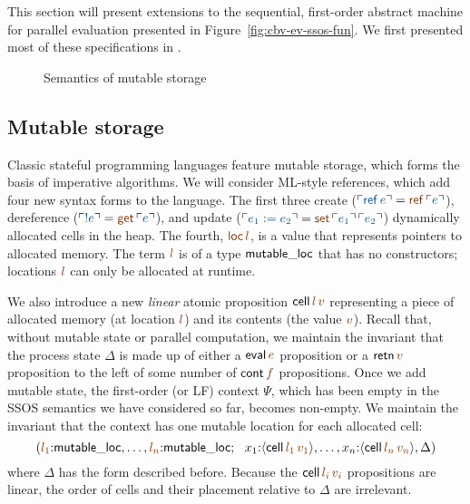 This section will present extensions to the sequential, first-order
abstract machine for parallel evaluation presented in
Figure~\ref{fig:cbv-ev-ssos-fun}. We first presented 
most of these specifications in
\cite{pfenning09substructural}.

\begin{figure}[t]
\caption{Semantics of mutable storage}
\label{fig:ssos-mutable}
\end{figure}

\subsection{Mutable storage}
\label{sec:mutable-storage}

Classic stateful programming languages feature mutable storage,
which forms the basis of imperative algorithms. We will consider
ML-style references, which add four new syntax forms to the language.
The first three create ($\interp{{\sf ref}\,e} = \lf{{\sf
  ref}\,\interp{e}}$), dereference ($\interp{{!}e} = \lf{{\sf
  get}\,\interp{e}}$), and update ($\interp{e_1 := e_2} = \lf{{\sf
  set}\,\interp{e_1}\,\interp{e_2}}$) dynamically allocated 
cells in the heap. 
The fourth, $\lf{{\sf loc}\,l}$, is a value that represents pointers
to allocated memory. The term $\lf{l}$ is of a type ${\sf mutable\_loc}$
that has no constructors; locations $\lf{l}$ can only be allocated at
runtime.

We also introduce a new {\it linear} atomic proposition ${\sf
  cell}\,\lf{l}\,\lf{v}$ representing a piece of allocated memory (at
location $\lf{l}$) and its contents (the value $\lf{v}$). Recall that,
without mutable state or parallel computation, we maintain the
invariant that the process state $\Delta$ is made up of either a ${\sf
  eval}\,\lf{e}$ proposition or a ${\sf retn}\,\lf{v}$ proposition to
the left of some number of ${\sf cont}\,\lf{f}$ propositions. Once we
add mutable state, the first-order (or LF) context $\Psi$, which has
been empty in the SSOS semantics we have considered so far, becomes
non-empty. We maintain the invariant that the context has one
mutable location for each allocated cell:
\[
(\lf{l_1}{:}{\sf mutable\_loc}, \ldots, \lf{l_n}{:}{\sf mutable\_loc}; ~~
 x_1{:}\susp{{\sf cell}\,\lf{l_1}\,\lf{v_1}}, \ldots, 
 x_n{:}\susp{{\sf cell}\,\lf{l_n}\,\lf{v_n}}, 
 \Delta)
\]
where $\Delta$ has the form described before. Because the ${\sf
  cell}\,\lf{l_i}\,\lf{v_i}$ propositions are linear, the order of cells and
their placement relative to $\Delta$ are irrelevant.

